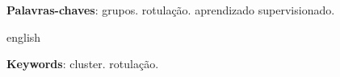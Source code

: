 \begin{resumo}

  \textbf{Palavras-chaves}: grupos. rotulação. aprendizado supervisionado. 
\end{resumo}

\begin{resumo}[Abstract]
 \begin{otherlanguage*}{english}

   
   
   \vspace{\onelineskip}
 
   \noindent 
   \textbf{Keywords}:  cluster. rotulação.
 \end{otherlanguage*}
\end{resumo}
